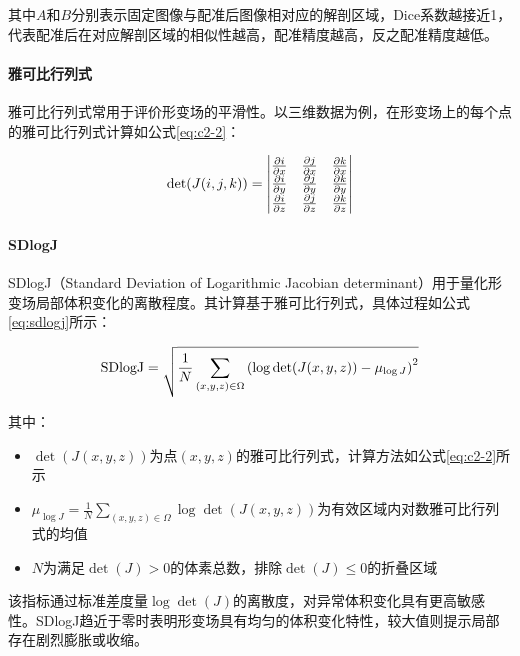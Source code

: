 其中$A$和$B$分别表示固定图像与配准后图像相对应的解剖区域，Dice系数越接近1，代表配准后在对应解剖区域的相似性越高，配准精度越高，反之配准精度越低。

\paragraph{雅可比行列式}

雅可比行列式常用于评价形变场的平滑性。以三维数据为例，在形变场上的每个点的雅可比行列式计算如公式\ref{eq:c2-2}：

\begin{equation}
    \centering
    \det(J(i,j,k))=\begin{vmatrix}\frac{\partial i}{\partial x} & \frac{\partial j}{\partial x} & \frac{\partial k}{\partial x} \\\frac{\partial i}{\partial y} & \frac{\partial j}{\partial y} & \frac{\partial k}{\partial y} \\\frac{\partial i}{\partial z} & \frac{\partial j}{\partial z} & \frac{\partial k}{\partial z}\end{vmatrix}
    \label{eq:c2-2}
\end{equation}

\paragraph{SDlogJ}
SDlogJ（Standard Deviation of Logarithmic Jacobian determinant）用于量化形变场局部体积变化的离散程度。其计算基于雅可比行列式，具体过程如公式\ref{eq:sdlogj}所示：

\begin{equation}
    \centering
    \text{SDlogJ} = \sqrt{ \frac{1}{N} \sum_{(x,y,z) \in \Omega} \left( \log \det(J(x,y,z)) - \mu_{\log J} \right)^2 }
    \label{eq:sdlogj}
\end{equation}

其中：
\begin{itemize}
    \item $\det(J(x,y,z))$为点$(x,y,z)$的雅可比行列式，计算方法如公式\ref{eq:c2-2}所示
    \item $\mu_{\log J} = \frac{1}{N} \sum_{(x,y,z) \in \Omega} \log \det(J(x,y,z))$为有效区域内对数雅可比行列式的均值
    \item $N$为满足$\det(J) > 0$的体素总数，排除$\det(J) \leq 0$的折叠区域
\end{itemize}

该指标通过标准差度量$\log \det(J)$的离散度，对异常体积变化具有更高敏感性。SDlogJ趋近于零时表明形变场具有均匀的体积变化特性，较大值则提示局部存在剧烈膨胀或收缩。

